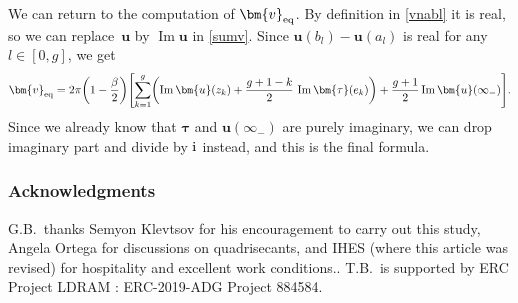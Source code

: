 \documentclass[10pt,a4paper]{amsart}
\numberwithin{equation}{section}
\begin{document}
We can return to the computation of $\bm{v}_{{\rm eq}}$. By definition in \eqref{vnabl} it is real, so we can replace~$\bm{u}$ by $\operatorname{Im} \bm{u}$ in \eqref{sumv}. Since $\bm{u}(b_l) - \bm{u}(a_l)$ is real for any $l \in [0,g]$, we get
\[
\bm{v}_{{\rm eq}} = 2\pi\biggl(1 - \frac{\beta}{2}\biggr)\Biggl[ \sum_{k = 1}^{g} \biggl(\operatorname{Im}\bm{u}(z_k) + \frac{g + 1 - k}{2}\,\operatorname{Im}\bm{\tau}(e_k)\biggr)+ \frac{g + 1}{2} \operatorname{Im}\bm{u}(\infty_-)\Biggr].
\]
Since we already know that $\bm{\tau}$ and $\bm{u}(\infty_-)$ are purely imaginary, we can drop imaginary part and divide by ${\rm i}$ instead, and this is the final formula.


\subsubsection*{Acknowledgments}


G.B.\ thanks Semyon Klevtsov for his encouragement to carry out this study, Angela Ortega for discussions on quadrisecants, and IHES (where this article was revised) for hospitality and excellent work conditions..
T.B.\ is supported by ERC Project LDRAM : ERC-2019-ADG Project 884584.
\end{document}
